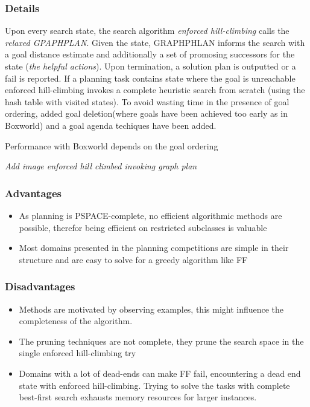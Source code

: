 \documentclass[runningheads,a4paper]{llncs}
\begin{document}
\subsubsection{Details}
Upon every search state, the search algorithm \emph{enforced hill-climbing} calls the \emph{relaxed GPAPHPLAN}. Given the state, GRAPHPHLAN informs the search with a goal distance estimate and additionally a set of promosing successors for the state (\emph{the helpful actions}). Upon termination, a solution plan is outputted or a fail is reported. If a planning task contains state where the goal is unreachable enforced hill-climbing invokes a complete heuristic search from scratch (using the hash table with visited states). To avoid wasting time in the presence of goal ordering, added goal deletion(where goals have been achieved too early as in Boxworld) and a goal agenda techiques have been added. 

Performance with Boxworld depends on the goal ordering

\emph{Add image enforced hill climbed invoking graph plan}

\subsubsection{Advantages}
\begin{itemize}
	\item As planning is PSPACE-complete, no efficient algorithmic methods are possible, therefor being efficient on restricted subclasses is valuable 
	\item Most domains presented in the planning competitions are simple in their structure and are easy to solve for a greedy algorithm like FF
\end{itemize}


\subsubsection{Disadvantages}
\begin{itemize}
	\item Methods are motivated by observing examples, this might influence the completeness of the algorithm. 
	\item The pruning techniques are not complete, they prune the search space in the single enforced hill-climbing try
	\item Domains with a lot of dead-ends can make FF fail, encountering a dead end state with enforced hill-climbing. Trying to solve the tasks with complete best-first search exhausts memory resources for larger instances. 
\end{itemize}
\end{document}
